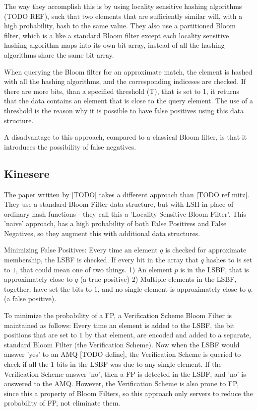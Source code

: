 \documentclass[a4paper,11pt]{article}
\begin{document}
The way they accomplish this is by using locality sensitive hashing algorithms (TODO REF), such that two elements that are sufficiently similar will, with a high probability, hash to the same value. They also use a partitioned Bloom filter, which is a like a standard Bloom filter except each locality sensitive hashing algorithm maps into its own bit array, instead of all the hashing algorithms share the same bit array.

When querying the Bloom filter for an approximate match, the element is hashed with all the hashing algorithms, and the corresponding indiceses are checked. If there are more bits, than a specified threshold (T), that is set to 1, it returns that the data contains an element that is close to the query element. The use of a threshold is the reason why it is possible to have false positives using this data structure.

A disadvantage to this approach, compared to a classical Bloom filter, is that it introduces the possibility of false negatives.





\subsection{Kinesere}
The paper written by [TODO] takes a different approach than [TODO ref mitz]. They use a standard Bloom Filter data structure, but with LSH in place of ordinary hash functions - they call this a 'Locality Sensitive Bloom Filter'. This 'naive' approach, has a high probability of both False Positives and False Negatives, so they augment this with additional data structures.

Minimizing False Positives:
Every time an element $q$ is checked for approximate membership, the LSBF is checked. If every bit in the array that $q$ hashes to is set to $1$, that could mean one of two things.
1) An element $p$ is in the LSBF, that is approximately close to $q$ (a true positive)
2) Multiple elements in the LSBF, together, have set the bits to $1$, and no single element is approximately close to $q$. (a false positive).

To minimize the probability of a FP, a Verification Scheme Bloom Filter is maintained as follows: Every time an element is added to the LSBF, the bit positions that are set to $1$ by that element, are encoded and added to a separate, standard Bloom Filter (the Verification Scheme). Now when the LSBF would answer 'yes' to an AMQ [TODO define], the Verification Scheme is queried to check if all the $1$ bits in the LSBF was due to any single element. If the Verification Scheme answer 'no', then a FP is detected in the LSBF, and 'no' is answered to the AMQ. However, the Verification Scheme is also prone to FP, since this a property of Bloom Filters, so this approach only servers to reduce the probability of FP, not eliminate them.
\end{document}
